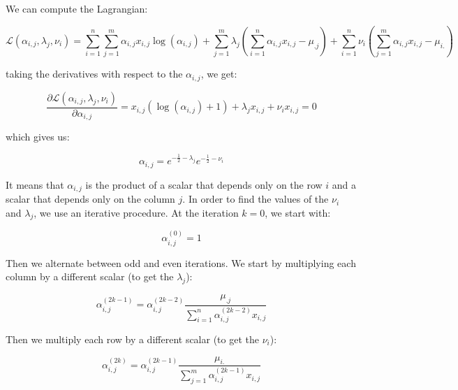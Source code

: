 We can compute the Lagrangian:

\begin{equation*}
\mathcal{L} \left( \alpha_{i,j} , \lambda_j , \nu_i \right) = \sum_{i = 1}^n \sum_{j = 1}^m \alpha_{i,j} x_{i,j} \log \left( \alpha_{i,j} \right) + \sum_{j = 1}^m \lambda_j \left( \sum_{i = 1}^n \alpha_{i,j} x_{i,j} - \mu_{.j} \right) + \sum_{i = 1}^n \nu_i \left( \sum_{j = 1}^m \alpha_{i,j} x_{i,j} - \mu_{i.} \right)
\end{equation*}

taking the derivatives with respect to the $\alpha_{i,j}$, we get:

\begin{equation*}
\frac{\partial \mathcal{L} \left( \alpha_{i,j}, \lambda_j , \nu_i \right)}{\partial \alpha_{i,j}} = x_{i,j} \left( \log \left( \alpha_{i,j} \right) + 1 \right) + \lambda_j x_{i,j} + \nu_i x_{i,j} = 0
\end{equation*}

which gives us:

\begin{equation*}
\alpha_{i,j} = e^{-\frac{1}{2} - \lambda_j} e^{-\frac{1}{2} - \nu_i}
\end{equation*}

It means that $\alpha_{i,j}$ is the product of a scalar that depends only on the row $i$ and a scalar that depends only on the column $j$. In order to find the values of the $\nu_i$ and $\lambda_j$, we use an iterative procedure. At the iteration $k = 0$, we start with:

\begin{equation*}
\alpha_{i,j}^{\left(0\right)} = 1
\end{equation*}

Then we alternate between odd and even iterations. We start by multiplying each column by a different scalar (to get the $\lambda_j$):

\begin{equation}
\alpha_{i,j}^{\left(2 k - 1\right)} = \alpha_{i,j}^{\left(2 k - 2\right)} \frac{\mu_{.j}}{\sum_{i = 1}^n \alpha_{i,j}^{\left(2 k - 2\right)} x_{i,j}}
\end{equation}

Then we multiply each row by a different scalar (to get the $\nu_i$):

\begin{equation}
\alpha_{i,j}^{\left(2 k\right)} = \alpha_{i,j}^{\left(2 k - 1\right)} \frac{\mu_{i.} }{\sum_{j = 1}^m \alpha_{i,j}^{\left(2 k - 1\right)} x_{i,j}}
\end{equation}

